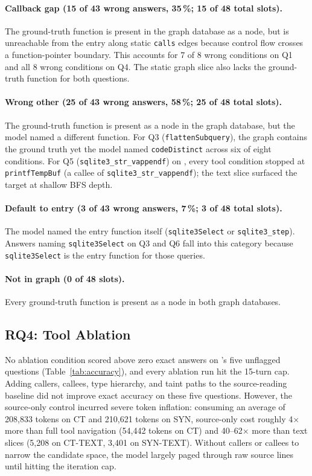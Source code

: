 \paragraph{Callback gap (15 of 43 wrong answers, 35\,\%; 15 of 48 total slots).}
The ground-truth function is present in the graph database as a node, but is
unreachable from the entry along static \texttt{calls} edges because control flow crosses
a function-pointer boundary.
This accounts for 7 of 8 wrong conditions on Q1 and all 8 wrong conditions on Q4.
The static graph slice also lacks the ground-truth function for both questions.

\paragraph{Wrong other (25 of 43 wrong answers, 58\,\%; 25 of 48 total slots).}
The ground-truth function is present as a node in the graph database, but the model
named a different function.
For Q3 (\texttt{flattenSubquery}), the graph contains the ground truth yet the model named
\texttt{codeDistinct} across six of eight conditions.
For Q5 (\texttt{sqlite3\_str\_vappendf}) on \qwen, every tool condition stopped at
\texttt{printfTempBuf} (a callee of \texttt{sqlite3\_str\_vappendf}); the text slice
surfaced the target at shallow BFS depth.

\paragraph{Default to entry (3 of 43 wrong answers, 7\,\%; 3 of 48 total slots).}
The model named the entry function itself (\texttt{sqlite3Select} or \texttt{sqlite3\_step}).
Answers naming \texttt{sqlite3Select} on Q3 and Q6 fall into this category because
\texttt{sqlite3Select} is the entry function for those queries.

\paragraph{Not in graph (0 of 48 slots).}
Every ground-truth function is present as a node in both graph databases.

\subsection{RQ4: Tool Ablation}

No ablation condition scored above zero exact answers on \qwen's five unflagged
questions (Table~\ref{tab:accuracy}), and every ablation run hit the 15-turn cap.
Adding callers, callees, type hierarchy, and taint paths to the source-reading
baseline did not improve exact accuracy on these five questions.
However, the source-only control incurred severe token inflation: consuming an average of
208{,}833 tokens on CT and 210{,}621 tokens on SYN, source-only cost roughly 4$\times$ more
than full tool navigation (54{,}442 tokens on CT) and 40--62$\times$ more than text slices
(5{,}208 on CT-TEXT, 3{,}401 on SYN-TEXT).
Without callers or callees to narrow the candidate space, the model largely paged through raw
source lines until hitting the iteration cap.

